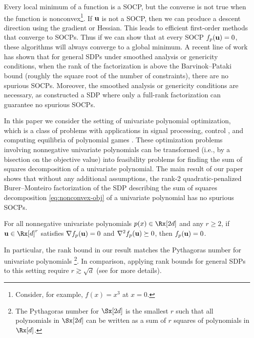 \documentclass[final,onefignum,onetabnum]{siamart220329}
\begin{document}
Every local minimum of a function is a SOCP, but the converse is not true when
the function is nonconvex\footnote{Consider, for example, $f(x) = x^3$ at
  $x=0$.}. If $\boldsymbol{\mathbf{u}}$ is not a SOCP, then we can produce a descent direction
using the gradient or Hessian. This leads to efficient first-order methods
\cite{ge2015escaping, jin2017escape} that converge to SOCPs. Thus if we can show
that at every SOCP $f_p(\boldsymbol{\mathbf{u}}) = 0$, these algorithms will always converge to
a global minimum. A recent line of work \cite{boumal2020deterministic,
  bhojanapalli2018smoothed} has shown that for general SDPs under smoothed
analysis or genericity conditions, when the rank of the factorization is above
the Barvinok--Pataki bound (roughly the square root of the number of
constraints), there are no spurious SOCPs.  Moreover, the smoothed analysis or
genericity conditions are necessary, as \cite{bhojanapalli2018smoothed}
constructed a SDP where only a full-rank factorization can guarantee no spurious
SOCPs.

In this paper we consider the setting of univariate polynomial optimization,
which is a class of problems with applications in signal processing, control
\cite{roh2006discrete, dumitrescu2007positive}, and computing equilibria
of polynomial games \cite{parrilo2006polynomial}. These optimization problems
involving nonnegative univariate polynomials can be transformed (i.e., by a
bisection on the objective value) into feasibility problems for finding the sum
of squares decomposition of a univariate polynomial. The main result of our
paper shows that without any additional assumptions, the rank-2
quadratic-penalized Burer--Monteiro factorization of the SDP describing the sum
of squares decomposition \eqref{eq:nonconvex-obj} of a univariate polynomial has
no spurious SOCPs.
\begin{theorem} \label{thm:main} For all nonnegative univariate polynomials
  $p(x)\in \Rx[2d]$ and any $r \ge 2$, if $\vecp{u} \in \Rx[d]^r$ satisfies
  $\nabla f_p(\boldsymbol{\mathbf{u}}) = 0$ and $\nabla^2 f_p(\boldsymbol{\mathbf{u}}) \succeq 0$, then
  $f_p(\boldsymbol{\mathbf{u}}) = 0$.
\end{theorem}
In particular, the rank bound in our result matches the Pythagoras number for
univariate polynomials \cite[Example 2.13]{choi1995sums}\footnote{The Pythagoras
  number for $\Sx[2d]$ is the smallest $r$ such that all polynomials in
  $\Sx[2d]$ can be written as a sum of $r$ squares of polynomials in
  $\Rx[d]$.}. In comparison, applying rank bounds for general SDPs to this
setting require $r \gtrsim \sqrt{d}$ (see  for more
details).
\end{document}
